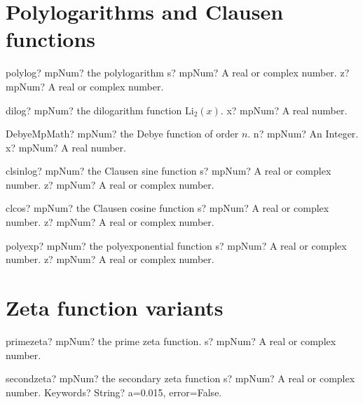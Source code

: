 \documentclass[12pt,a4paper,openany]{book}
\begin{document}
\section{Polylogarithms and Clausen functions}

\begin{mpFunctionsExtract}
\mpFunctionTwo
{polylog? mpNum? the polylogarithm}
{s? mpNum? A real or complex number.}
{z? mpNum? A real or complex number.}
\end{mpFunctionsExtract}

\begin{mpFunctionsExtract}
\mpFunctionOne
{dilog? mpNum? the dilogarithm function $\text{Li}_2(x)$.}
{x? mpNum? A real number.}
\end{mpFunctionsExtract}

\begin{mpFunctionsExtract}
\mpFunctionTwoNotImplemented
{DebyeMpMath? mpNum? the Debye function of order $n$.}
{n? mpNum? An Integer.}
{x? mpNum? A real number.}
\end{mpFunctionsExtract}

\begin{mpFunctionsExtract}
\mpFunctionTwo
{clsinlog? mpNum? the Clausen sine function}
{s? mpNum? A real or complex number.}
{z? mpNum? A real or complex number.}
\end{mpFunctionsExtract}

\begin{mpFunctionsExtract}
\mpFunctionTwo
{clcos? mpNum? the Clausen cosine function}
{s? mpNum? A real or complex number.}
{z? mpNum? A real or complex number.}
\end{mpFunctionsExtract}

\begin{mpFunctionsExtract}
\mpFunctionTwo
{polyexp? mpNum? the polyexponential function}
{s? mpNum? A real or complex number.}
{z? mpNum? A real or complex number.}
\end{mpFunctionsExtract}

\section{Zeta function variants}

\begin{mpFunctionsExtract}
\mpFunctionOne
{primezeta? mpNum? the prime zeta function.}
{s? mpNum? A real or complex number.}
\end{mpFunctionsExtract}

\begin{mpFunctionsExtract}
\mpFunctionTwo
{secondzeta? mpNum? the secondary zeta function}
{s? mpNum? A real or complex number.}
{Keywords? String? a=0.015, error=False.}
\end{mpFunctionsExtract}
\end{document}
